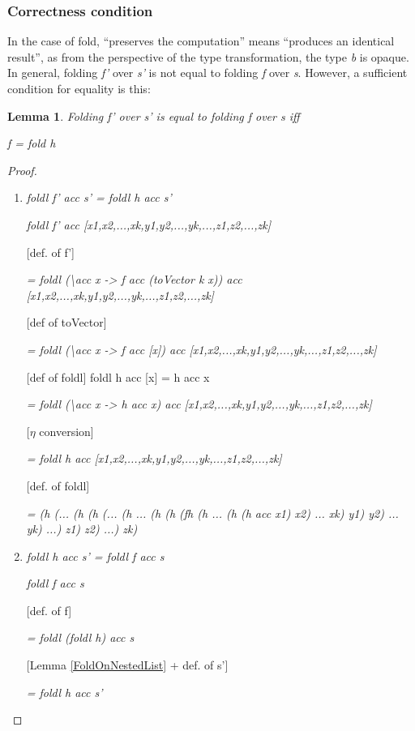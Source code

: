 \documentclass{article}
\newtheorem{lemma}{Lemma}
\begin{document}
\subsubsection{Correctness condition}

In the case of fold, ``preserves the computation'' means ``produces
an identical result'', as from the perspective of the type transformation,
the type \emph{b} is opaque. In general, folding \emph{f'} over \emph{s'}
is not equal to folding \emph{f} over \emph{s}. However, a sufficient
condition for equality is this:

\begin{lemma}

Folding \emph{f'} over \emph{s'} is equal to folding \emph{f} over
\emph{s} iff 

\emph{f = fold h}

\end{lemma}

\begin{proof}

~
\begin{enumerate}
\item \emph{foldl f' acc s' = foldl h acc s'}


\emph{foldl f' acc {[}x1,x2,...,xk,y1,y2,...,yk,...,z1,z2,...,zk{]}}


{[}def. of f'{]}


\emph{= foldl (\textbackslash{}acc x -> f acc (toVector k x)) acc
{[}x1,x2,...,xk,y1,y2,...,yk,...,z1,z2,...,zk{]}}


{[}def of toVector{]}


\emph{= foldl (\textbackslash{}acc x -> f acc {[}x{]}) acc {[}x1,x2,...,xk,y1,y2,...,yk,...,z1,z2,...,zk{]}}


{[}def of foldl{]} foldl h acc {[}x{]} = h acc x


\emph{= foldl (\textbackslash{}acc x -> h acc x) acc {[}x1,x2,...,xk,y1,y2,...,yk,...,z1,z2,...,zk{]}}


{[}$\eta$ conversion{]} 


\emph{= foldl h acc {[}x1,x2,...,xk,y1,y2,...,yk,...,z1,z2,...,zk{]}}


{[}def. of foldl{]}


\emph{= (h (... (h (h (... (h ... (h (h (fh (h ... (h (h acc x1) x2)
... xk) y1) y2) ... yk) ...) z1) z2) ...) zk)}

\item \emph{foldl h acc s' = foldl f acc s}


\emph{foldl f acc s}


{[}def. of f{]}


\emph{= foldl (foldl h) acc s}


{[}Lemma \ref{FoldOnNestedList} + def. of s'{]}


\emph{= foldl h acc s'}

\end{enumerate}
\end{proof}
\end{document}
